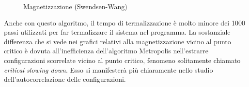 \begin{figure}[h]
\caption{Magnetizzazione  (Swendsen-Wang)}
\end{figure}
Anche con questo algoritmo, il tempo di termalizzazione è molto minore dei 1000 passi utilizzati per far termalizzare il sistema nel programma.
La sostanziale differenza che si vede nei grafici relativi alla magnetizzazione vicino al punto critico è dovuta all'inefficienza dell'algoritmo Metropolis nell'estrarre configurazioni scorrelate vicino al punto critico, fenomeno solitamente chiamato \emph{critical slowing down}.
Esso si manifesterà più chiaramente nello studio dell'autocorrelazione delle configurazioni.


